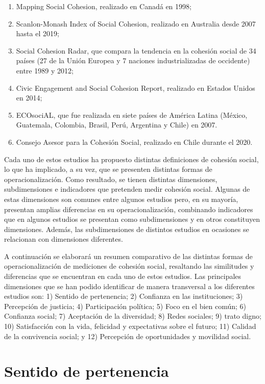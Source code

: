 \documentclass[
  12pt,
]{book}
\begin{document}
\begin{enumerate}
\def\labelenumi{\arabic{enumi})}
\item
  Mapping Social Cohesion, realizado en Canadá en 1998;
\item
  Scanlon-Monash Index of Social Cohesion, realizado en Australia desde 2007 hasta el 2019;
\item
  Social Cohesion Radar, que compara la tendencia en la cohesión social de 34 países (27 de la Unión Europea y 7 naciones industrializadas de occidente) entre 1989 y 2012;
\item
  Civic Engagement and Social Cohesion Report, realizado en Estados Unidos en 2014;
\item
  ECOsociAL, que fue realizada en siete países de América Latina (México, Guatemala, Colombia, Brasil, Perú, Argentina y Chile) en 2007.
\item
  Consejo Asesor para la Cohesión Social, realizado en Chile durante el 2020.
\end{enumerate}

Cada uno de estos estudios ha propuesto distintas definiciones de cohesión social, lo que ha implicado, a su vez, que se presenten distintas formas de operacionalización. Como resultado, se tienen distintas dimensiones, subdimensiones e indicadores que pretenden medir cohesión social. Algunas de estas dimensiones son comunes entre algunos estudios pero, en su mayoría, presentan amplias diferencias en su operacionalización, combinando indicadores que en algunos estudios se presentan como subdimensiones y en otros constituyen dimensiones. Además, las subdimensiones de distintos estudios en ocasiones se relacionan con dimensiones diferentes.

A continuación se elaborará un resumen comparativo de las distintas formas de operacionalización de mediciones de cohesión social, resaltando las similitudes y diferencias que se encuentran en cada uno de estos estudios. Las principales dimensiones que se han podido identificar de manera transversal a los diferentes estudios son: 1) Sentido de pertenencia; 2) Confianza en las instituciones; 3) Percepción de justicia; 4) Participación política; 5) Foco en el bien común; 6) Confianza social; 7) Aceptación de la diversidad; 8) Redes sociales; 9) trato digno; 10) Satisfacción con la vida, felicidad y expectativas sobre el futuro; 11) Calidad de la convivencia social; y 12) Percepción de oportunidades y movilidad social.

\hypertarget{sentido-de-pertenencia}{%
\section{Sentido de pertenencia}\label{sentido-de-pertenencia}}
\end{document}

